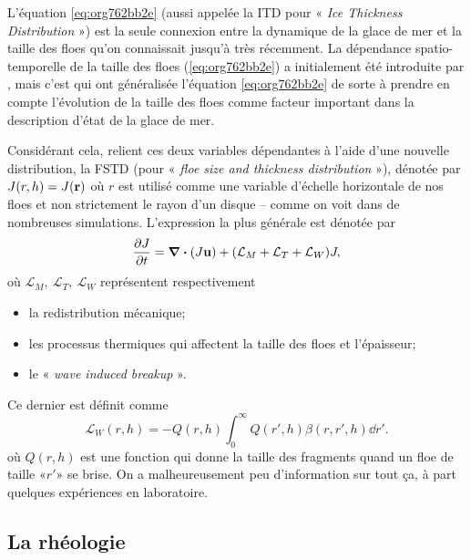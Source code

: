 \documentclass[10pt]{article}
\numberwithin{equation}{section}
\newcommand{\uu}{\vb{u}}
\begin{document}
L'équation \ref{eq:org762bb2e} (aussi appelée la ITD pour « \emph{Ice Thickness Distribution} »)  est la seule connexion entre la dynamique de la glace de mer et la taille des floes qu'on connaissait jusqu'à très récemment.
La dépendance spatio-temporelle de la taille des floes (\ref{eq:org762bb2e}) a initialement été introduite par \Textcite{zhang2015sea}, mais c'est \Textcite{horvat2015prognostic} qui ont généralisée l'équation \ref{eq:org762bb2e} de sorte à prendre en compte l'évolution de la taille des floes comme facteur important dans la description d'état de la glace de mer.\bigskip

Considérant cela, \Textcite{horvat2015prognostic} relient ces deux variables dépendantes à l'aide d'une nouvelle distribution, la FSTD (pour « \emph{floe size and thickness distribution} »), dénotée par \(J(r,h)=J(\vb{r})\) où \(r\) est utilisé comme une variable d'échelle horizontale de nos floes et non strictement le rayon d'un disque -- comme on voit dans de nombreuses simulations.
L'expression la plus générale est dénotée par 
\begin{equation}
   \pdv{J}{t} = \-\divergence{(J\uu)} + \qty(\mathcal{L}_M + \mathcal{L}_T + \mathcal{L}_W) J,
\end{equation}
où \(\mathcal{L}_M ,\ \mathcal{L}_T ,\ \mathcal{L}_W\) représentent respectivement
\begin{itemize}
\item la redistribution mécanique;
\item les processus thermiques qui affectent la taille des floes et l'épaisseur;
\item le « \emph{wave induced breakup} ».
\end{itemize}
Ce dernier est définit comme
\begin{equation}
   \mathcal{L}_W(r,h) = -Q(r,h) \int_0^\infty Q(r',h) \beta(r,r',h) \dd r'.
\end{equation}
où \(Q(r,h)\) est une fonction qui donne la taille des fragments quand un floe de taille «\(r'\)» se brise.
On a malheureusement peu d'information sur tout ça, à part quelques expériences en laboratoire.

\subsection{La rhéologie}
\label{sec:org8d68159}
\end{document}
